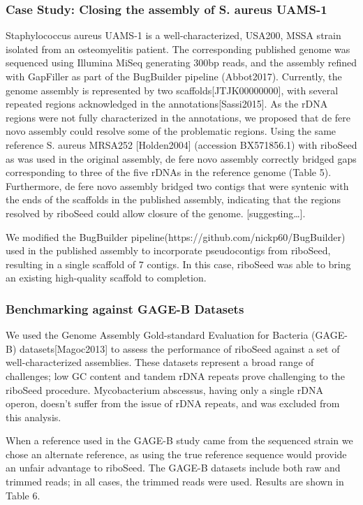 \documentclass[11pt]{article}
\begin{document}
\begin{linenumbers}
\subsubsection*{Case Study: Closing the assembly of S. aureus UAMS-1}
Staphylococcus aureus UAMS-1 is a well-characterized, USA200, MSSA strain isolated from an osteomyelitis patient. The corresponding published genome was sequenced using Illumina MiSeq generating 300bp reads, and the assembly refined with GapFiller as part of the BugBuilder pipeline (Abbot2017). Currently, the genome assembly is represented by two scaffolds[JTJK00000000], with several repeated regions acknowledged in the annotations[Sassi2015]. As the rDNA regions were not fully characterized in the annotations, we proposed that de fere novo assembly could resolve some of the problematic regions. Using the same reference S. aureus MRSA252 [Holden2004] (accession BX571856.1) with riboSeed as was used in the original assembly, de fere novo assembly correctly bridged gaps corresponding to three of the five rDNAs in the reference genome (Table 5). Furthermore, de fere novo assembly bridged two contigs that were syntenic with the ends of the scaffolds in the published assembly, indicating that the regions resolved by riboSeed could allow closure of the genome. [suggesting…].


We modified the BugBuilder pipeline(https://github.com/nickp60/BugBuilder) used in the published assembly to incorporate pseudocontigs from riboSeed, resulting in a single scaffold of 7 contigs. In this case, riboSeed was able to bring an existing high-quality scaffold to completion.

\subsubsection*{Benchmarking against GAGE-B Datasets}
We used the Genome Assembly Gold-standard Evaluation for Bacteria (GAGE-B) datasets[Magoc2013] to assess the performance of riboSeed against a set of well-characterized assemblies. These datasets represent a broad range of challenges; low GC content and tandem rDNA repeats prove challenging to the riboSeed procedure. Mycobacterium abscessus, having only a single rDNA operon, doesn’t suffer from the issue of rDNA repeats, and was excluded from this analysis.


When a reference used in the GAGE-B study came from the sequenced strain we chose an alternate reference, as using the true reference sequence would provide an unfair advantage to riboSeed. The GAGE-B datasets include both raw and trimmed reads; in all cases, the trimmed reads were used. Results are shown in Table 6.




\end{linenumbers}
\end{document}

